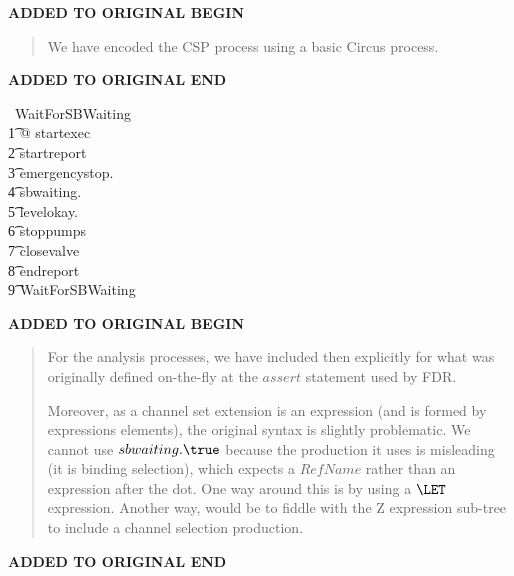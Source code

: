\documentclass{report}
\newenvironment{addedstuff}{\begin{flushleft}\textbf{ADDED TO ORIGINAL BEGIN}\begin{quote}\begin{minipage}{.8\textwidth}}{\end{minipage}\end{quote}\textbf{ADDED TO ORIGINAL END}\end{flushleft}}
\begin{document}
\begin{addedstuff}
   We have encoded the CSP process using a basic Circus process.
\end{addedstuff}
\begin{circus}
   \circprocess\ WaitForSBWaiting \circdef \circbegin \\
   \t1 @ startexec \then \\
        \t2 startreport \then \\
            \t3 emergencystop.\false \then \\
                \t4 sbwaiting.\false \then \\
                    \t5 levelokay.\true \then \\
                        \t6 stoppumps \then \\
                            \t7 closevalve \then \\
                                \t8 endreport \then \\
                                    \t9 WaitForSBWaiting \\
   \circend
\end{circus}

\begin{addedstuff}
   For the analysis processes, we have included then explicitly for
   what was originally defined on-the-fly at the $assert$ statement
   used by FDR.

   Moreover, as a channel set extension is an expression (and is formed by expressions elements),
   the original syntax is slightly problematic. We cannot use $sbwaiting.\true$ because the production
   it uses is misleading (it is binding selection), which expects a $RefName$ rather than an expression
   after the dot. One way around this is by using a $\LET$ expression. Another way, would be to
   fiddle with the Z expression sub-tree to include a channel selection production.
\end{addedstuff}
\end{document}
